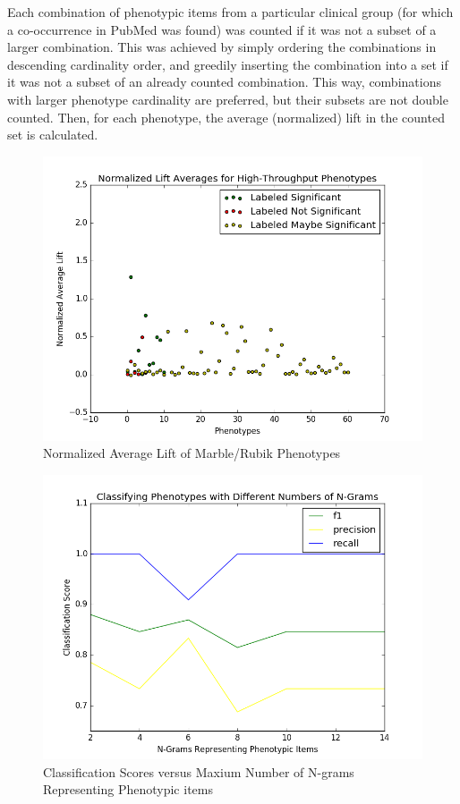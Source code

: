 \documentclass{sig-alternate-05-2015}
\begin{document}
Each combination of phenotypic items from a particular clinical group (for which a co-occurrence in PubMed was found) was counted if it was not a subset of a larger combination. 
This was achieved by simply ordering the combinations in descending cardinality order, and greedily inserting the combination into a set if it was not a subset of an already counted combination. 
This way, combinations with larger phenotype cardinality are preferred, but their subsets are not double counted. Then, for each phenotype, the average (normalized) lift in the counted set is calculated.


\begin{figure} [t]
\centering
\includegraphics[width=\linewidth]{kho_josh_all2.png}
\caption{Normalized Average Lift of Marble/Rubik Phenotypes}
\label{fig:kho-josh-all}
\end{figure}

\begin{figure} [t]
\centering
\includegraphics[width=\linewidth] {classificationWithVariableNG.png}
\caption{Classification Scores versus Maxium Number of N-grams Representing Phenotypic items}
\label{fig:classificationVarNG}
\end{figure}
\end{document}

